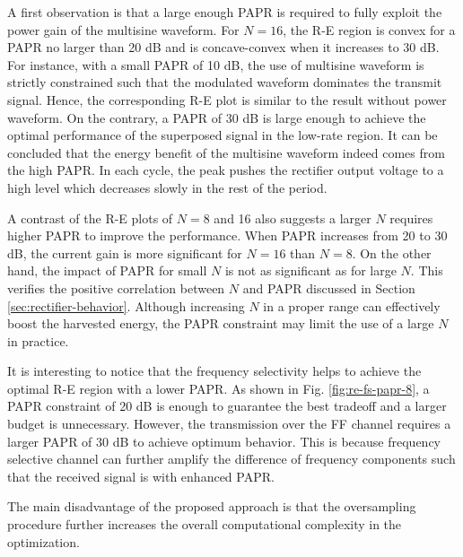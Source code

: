 A first observation is that a large enough PAPR is required to fully exploit the power gain of the multisine waveform. For $N = 16$, the R-E region is convex for a PAPR no larger than 20 dB and is concave-convex when it increases to 30 dB. For instance, with a small PAPR of 10 dB, the use of multisine waveform is strictly constrained such that the modulated waveform dominates the transmit signal. Hence, the corresponding R-E plot is similar to the result without power waveform. On the contrary, a PAPR of 30 dB is large enough to achieve the optimal performance of the superposed signal in the low-rate region. It can be concluded that the energy benefit of the multisine waveform indeed comes from the high PAPR. In each cycle, the peak pushes the rectifier output voltage to a high level which decreases slowly in the rest of the period.

A contrast of the R-E plots of $N = 8$ and 16 also suggests a larger $N$ requires higher PAPR to improve the performance. When PAPR increases from 20 to 30 dB, the current gain is more significant for $N = 16$ than $N = 8$. On the other hand, the impact of PAPR for small $N$ is not as significant as for large $N$. This verifies the positive correlation between $N$ and PAPR discussed in Section \ref{sec:rectifier-behavior}. Although increasing $N$ in a proper range can effectively boost the harvested energy, the PAPR constraint may limit the use of a large $N$ in practice.

It is interesting to notice that the frequency selectivity helps to achieve the optimal R-E region with a lower PAPR. As shown in Fig. \ref{fig:re-fs-papr-8}, a PAPR constraint of 20 dB is enough to guarantee the best tradeoff and a larger budget is unnecessary. However, the transmission over the FF channel requires a larger PAPR of 30 dB to achieve optimum behavior. This is because frequency selective channel can further amplify the difference of frequency components such that the received signal is with enhanced PAPR.

The main disadvantage of the proposed approach is that the oversampling procedure further increases the overall computational complexity in the optimization. 